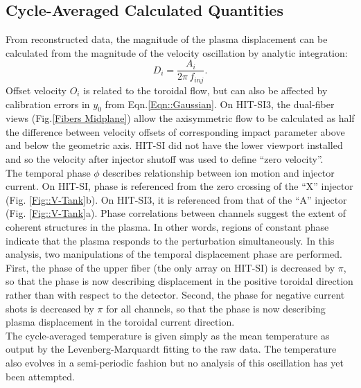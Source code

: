 \subsection{Cycle-Averaged Calculated Quantities}\label{sec::CalcQuant}
From reconstructed data, the magnitude of the plasma displacement can be calculated from the magnitude of the velocity oscillation by analytic integration:
\begin{equation}
D_i=\frac{A_i}{{2\pi}\,f_{inj}}.
\end{equation}
Offset velocity $O_i$ is related to the toroidal flow, but can also be affected by calibration errors in $y_0$ from Eqn.\ref{Eqn::Gaussian}. On HIT-SI3, the dual-fiber views (Fig.\ref{Fibers Midplane}) allow the axisymmetric flow to be calculated as half the difference between velocity offsets of corresponding impact parameter above and below the geometric axis. HIT-SI did not have the lower viewport installed and so the velocity after injector shutoff was used to define ``zero velocity''.\\
\hspace*{4ex}The temporal phase $\phi$ describes relationship between ion motion and injector current. On HIT-SI, phase is referenced from the zero crossing of the ``X'' injector (Fig. \ref{Fig::V-Tank}b). On HIT-SI3, it is referenced from that of the ``A'' injector (Fig. \ref{Fig::V-Tank}a). Phase correlations between channels suggest the extent of coherent structures in the plasma. In other words, regions of constant phase indicate that the plasma responds to the perturbation simultaneously.  In this analysis, two manipulations of the temporal displacement phase are performed. First, the phase of the upper fiber (the only array on HIT-SI) is decreased by $\pi$, so that the phase is now describing displacement in the positive toroidal direction rather than with respect to the detector. Second, the phase for negative current shots is decreased by $\pi$ for all channels, so that the phase is now describing plasma displacement in the toroidal current direction.   \\
\hspace*{4ex}The cycle-averaged temperature is given simply as the mean temperature as output by the Levenberg-Marquardt fitting to the raw data. The temperature also evolves in a semi-periodic fashion but no analysis of this oscillation has yet been attempted.
